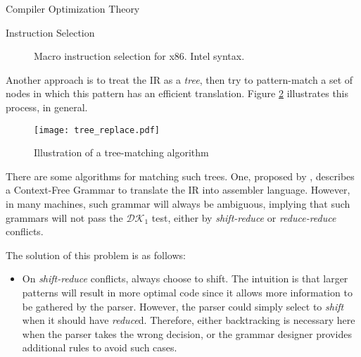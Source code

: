 \begin{section}{Compiler Optimization Theory}
\begin{subsection}{Instruction Selection}
\begin{figure}
\begin{center}
{
}
\end{center}
\caption{Macro instruction selection for x86. Intel syntax.}
\label{fig:macro_exp}
\end{figure}

Another approach is to treat the IR as a \textit{tree}, then try to
pattern-match a set of nodes in which this pattern has an efficient
translation.  Figure \ref{fig:tree-matching} illustrates this process, in
general.

\begin{figure}
\centering
	 \texttt{[image: tree\_replace.pdf]}
	  \caption{Illustration of a tree-matching algorithm}
	  \label{fig:tree-matching}
\end{figure}

There are some algorithms for matching such trees. One, proposed by
\cite{glanville1978}, describes a Context-Free Grammar to translate
the IR into assembler language. However, in many machines, such grammar
will always be ambiguous, implying that such grammars will not pass
the $\mathcal{DK}_1$ test, either by \textit{shift-reduce} or
\textit{reduce-reduce} conflicts.

	The solution of this problem is as follows:

	\begin{itemize}
		\item On \textit{shift-reduce} conflicts, always choose to shift. The intuition is that larger patterns will result in more optimal code since it allows more information to be gathered by the parser. However, the parser could simply select to \textit{shift} when it should have 	\textit{reduce}d. Therefore, either backtracking is necessary here when the parser takes the wrong decision, or the grammar designer provides additional rules to avoid such cases.


\end{itemize}
\end{subsection}
\end{section}
